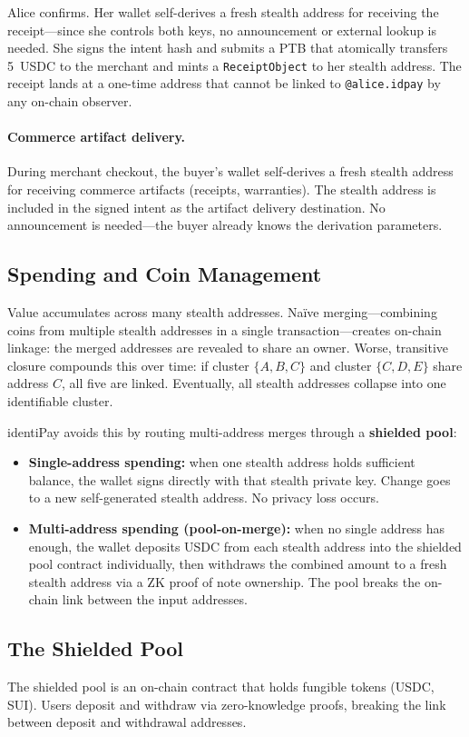 \documentclass[11pt]{article}
\begin{document}
Alice confirms. Her wallet self-derives a fresh stealth address for receiving the receipt---since she controls both keys, no announcement or external lookup is needed. She signs the intent hash and submits a PTB that atomically transfers 5~USDC to the merchant and mints a \texttt{ReceiptObject} to her stealth address. The receipt lands at a one-time address that cannot be linked to \texttt{@alice.idpay} by any on-chain observer.

\paragraph{Commerce artifact delivery.}
During merchant checkout, the buyer's wallet self-derives a fresh stealth address for receiving commerce artifacts (receipts, warranties). The stealth address is included in the signed intent as the artifact delivery destination. No announcement is needed---the buyer already knows the derivation parameters.

\subsection{Spending and Coin Management}
Value accumulates across many stealth addresses. Na\"ive merging---combining coins from multiple stealth addresses in a single transaction---creates on-chain linkage: the merged addresses are revealed to share an owner. Worse, transitive closure compounds this over time: if cluster $\{A,B,C\}$ and cluster $\{C,D,E\}$ share address $C$, all five are linked. Eventually, all stealth addresses collapse into one identifiable cluster.

identiPay avoids this by routing multi-address merges through a \textbf{shielded pool}:
\begin{itemize}
  \item \textbf{Single-address spending:} when one stealth address holds sufficient balance, the wallet signs directly with that stealth private key. Change goes to a new self-generated stealth address. No privacy loss occurs.
  \item \textbf{Multi-address spending (pool-on-merge):} when no single address has enough, the wallet deposits USDC from each stealth address into the shielded pool contract individually, then withdraws the combined amount to a fresh stealth address via a ZK proof of note ownership. The pool breaks the on-chain link between the input addresses.
\end{itemize}

\subsection{The Shielded Pool}
The shielded pool is an on-chain contract that holds fungible tokens (USDC, SUI). Users deposit and withdraw via zero-knowledge proofs, breaking the link between deposit and withdrawal addresses.
\end{document}
